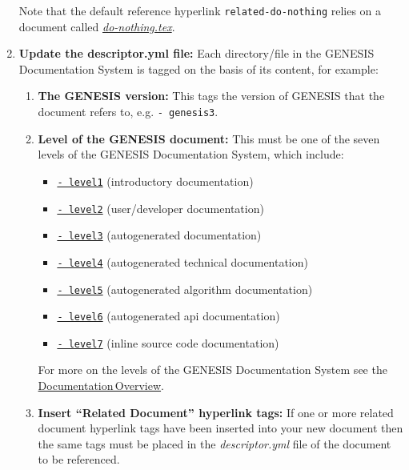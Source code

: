 \documentclass[12pt]{article}
\begin{document}
\begin{enumerate}
Note that the default reference hyperlink {\tt related-do-nothing} relies on a document called \href{../do-nothing/do-nothing.tex}{\it do-nothing.tex}. 

\item {\bf Update the descriptor.yml file:} Each directory/file in the GENESIS Documentation System is tagged on the basis of its content, for example:

   \begin{enumerate}

      \item  {\bf The GENESIS version:} This tags the version of GENESIS that the document refers to, e.g. {\tt -\,genesis3}.

      \item {\bf Level of the GENESIS document:} This must be one of the seven levels of the GENESIS Documentation System, which include:
      
      \begin{itemize}
         \item[]\href{../contents-level1/contents-level1.tex}{\tt -\,level1} (introductory documentation)
         \item[]\href{../contents-level2/contents-level2.tex}{\tt -\,level2} (user/developer documentation)
         \item[]\href{../contents-level3/contents-level3.tex}{\tt -\,level3} (autogenerated documentation)
         \item[]\href{../contents-level4/contents-level4.tex}{\tt -\,level4} (autogenerated technical documentation)
         \item[]\href{../contents-level5/contents-level5.tex}{\tt -\,level5} (autogenerated algorithm documentation)
         \item[]\href{../contents-level6/contents-level6.tex}{\tt -\,level6} (autogenerated api documentation)
         \item[]\href{../contents-level7/contents-level7.tex}{\tt -\,level7} (inline source code documentation)
      \end{itemize}

For more on the levels of the GENESIS Documentation System see the \href{../documentation-overview/documentation-overview.tex}{Documentation\,Overview}.

\item {\bf Insert ``Related Document'' hyperlink tags:} If one or more related document hyperlink tags have been inserted into your new document then the same tags must be placed in the {\it descriptor.yml} file of the document to be referenced.


\end{enumerate}
\end{enumerate}
\end{document}
